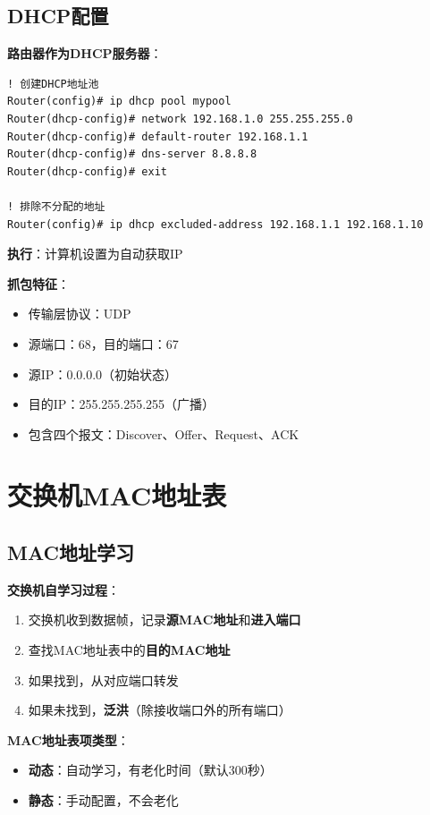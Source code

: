\documentclass[12pt,a4paper]{ctexart}
\begin{document}
\subsection{DHCP配置}

\begin{cmdbox}
\textbf{路由器作为DHCP服务器}：
\begin{lstlisting}
! 创建DHCP地址池
Router(config)# ip dhcp pool mypool
Router(dhcp-config)# network 192.168.1.0 255.255.255.0
Router(dhcp-config)# default-router 192.168.1.1
Router(dhcp-config)# dns-server 8.8.8.8
Router(dhcp-config)# exit

! 排除不分配的地址
Router(config)# ip dhcp excluded-address 192.168.1.1 192.168.1.10
\end{lstlisting}
\end{cmdbox}

\begin{exambox}[DHCP抓包分析]
\textbf{执行}：计算机设置为自动获取IP

\textbf{抓包特征}：
\begin{itemize}[itemsep=0pt]
    \item 传输层协议：UDP
    \item 源端口：68，目的端口：67
    \item 源IP：0.0.0.0（初始状态）
    \item 目的IP：255.255.255.255（广播）
    \item 包含四个报文：Discover、Offer、Request、ACK
\end{itemize}
\end{exambox}

\section{交换机MAC地址表}

\subsection{MAC地址学习}

\begin{keybox}
\textbf{交换机自学习过程}：

\begin{enumerate}[itemsep=0pt]
    \item 交换机收到数据帧，记录\textbf{源MAC地址}和\textbf{进入端口}
    \item 查找MAC地址表中的\textbf{目的MAC地址}
    \item 如果找到，从对应端口转发
    \item 如果未找到，\textbf{泛洪}（除接收端口外的所有端口）
\end{enumerate}

\textbf{MAC地址表项类型}：
\begin{itemize}[itemsep=0pt]
    \item \textbf{动态}：自动学习，有老化时间（默认300秒）
    \item \textbf{静态}：手动配置，不会老化
\end{itemize}
\end{keybox}
\end{document}
